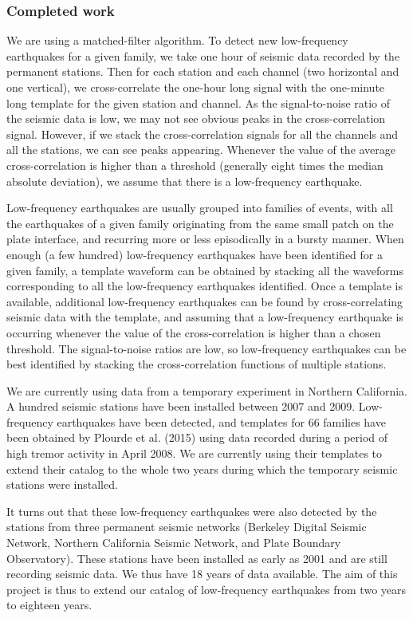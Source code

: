 \documentclass[letterpaper, 12pt]{article}
\begin{document}
\subsubsection*{Completed work}

We are using a matched-filter algorithm. To detect new low-frequency earthquakes for a given family, we take one hour of seismic data recorded by the permanent stations. Then for each station and each channel (two horizontal and one vertical), we cross-correlate the one-hour long signal with the one-minute long template for the given station and channel. As the signal-to-noise ratio of the seismic data is low, we may not see obvious peaks in the cross-correlation signal. However, if we stack the cross-correlation signals for all the channels and all the stations, we can see peaks appearing. Whenever the value of the average cross-correlation is higher than a threshold (generally eight times the median absolute deviation), we assume that there is a low-frequency earthquake.




  Low-frequency earthquakes are usually grouped into families of events, with all the earthquakes of a given family originating from the same small patch on the plate interface, and recurring more or less episodically in a bursty manner. When enough (a few hundred) low-frequency earthquakes have been identified for a given family, a template waveform can be obtained by stacking all the waveforms corresponding to all the low-frequency earthquakes identified. Once a template is available, additional low-frequency earthquakes can be found by cross-correlating seismic data with the template, and assuming that a low-frequency earthquake is occurring whenever the value of the cross-correlation is higher than a chosen threshold.  The signal-to-noise ratios are low, so low-frequency earthquakes can be best identified by stacking the cross-correlation functions of multiple stations.


We are currently using data from a temporary experiment in Northern California. A hundred seismic stations have been installed between 2007 and 2009. Low-frequency earthquakes have been detected, and templates for 66 families have been obtained by Plourde et al. (2015) using data recorded during a period of high tremor activity in April 2008. We are currently using their templates to extend their catalog to the whole two years during which the temporary seismic stations were installed.

It turns out that these low-frequency earthquakes were also detected by the stations from three permanent seismic networks (Berkeley Digital Seismic Network, Northern California Seismic Network, and Plate Boundary Observatory). These stations have been installed as early as 2001 and are still recording seismic data. We thus have 18 years of data available. The aim of this project is thus to extend our catalog of low-frequency earthquakes from two years to eighteen years.
\end{document}
